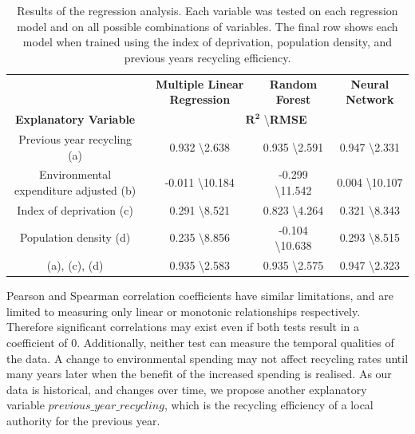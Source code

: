 \documentclass[11pt,conference]{IEEEtran}
\begin{document}
\begin{table}[!ht]
\centering
\caption{Results of the regression analysis. Each variable was tested on each regression model and on all possible combinations of variables. The final row shows each model when trained using the index of deprivation, population density, and previous years recycling efficiency.}
\begin{tabular}{@{\extracolsep{1pt}}cccc}
\toprule
   					 &    \textbf{Multiple Linear Regression}    & \textbf{Random Forest}   	 &    \textbf{Neural Network}  \\
\cmidrule(lr){2-2} \cmidrule(lr){3-3} \cmidrule(lr){4-4}
\textbf{Explanatory Variable}  &   \multicolumn{3}{c}{$\mathbf{R^2}$ \textbackslash \textbf{RMSE}}. \\
\midrule
   					 
Previous year recycling (a)  		 & 0.932  \textbackslash 2.638 	& 0.935 \textbackslash 2.591   & 0.947 \textbackslash 2.331                       	\\
Environmental expenditure adjusted (b) & -0.011 \textbackslash 10.184   & -0.299 \textbackslash 11.542& 0.004 \textbackslash 10.107                    	\\
Index of deprivation (c)                		 & 0.291  \textbackslash 8.521 	& 0.823 \textbackslash 4.264   & 0.321 \textbackslash 8.343                      	\\
Population density   (d)           			 & 0.235 \textbackslash 8.856  	& -0.104 \textbackslash 10.638& 0.293 \textbackslash 8.515                      	\\
\midrule
(a), (c), (d) &0.935 \textbackslash 2.583 & 0.935 \textbackslash 2.575 &0.947 \textbackslash 2.323 \\
\bottomrule
\end{tabular}
\label{table:params}
\end{table}

Pearson and Spearman correlation coefficients have similar limitations, and are limited to measuring only linear or monotonic relationships respectively. Therefore significant correlations may exist even if both tests result in a coefficient of 0. Additionally, neither test can measure the temporal qualities of the data. A change to environmental spending may not affect recycling rates until many years later when the benefit of the increased spending is realised. As our data is historical, and changes over time, we propose another explanatory variable $previous\_year\_recycling$, which is the recycling efficiency of a local authority for the previous year.
\end{document}
